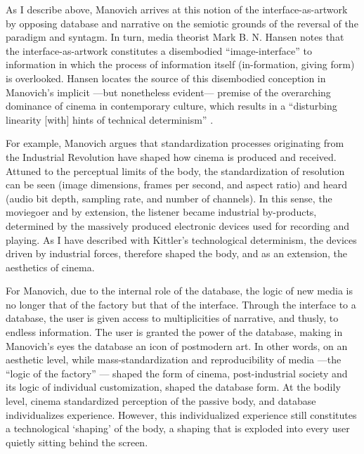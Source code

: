 As I describe above, Manovich arrives at this notion of the interface-as-artwork by opposing database and narrative on the semiotic grounds of the reversal of the paradigm and syntagm. In turn, media theorist Mark B. N. Hansen \parencite{Han04:New} notes that the interface-as-artwork constitutes a disembodied ``image-interface'' to information in which the process of information itself (in-formation, giving form) is overlooked. Hansen locates the source of this disembodied conception in Manovich's implicit ---but nonetheless evident--- premise of the overarching dominance of cinema in contemporary culture, which results in a ``disturbing linearity [with] hints of technical determinism'' \parencite[36]{Han04:New}.

For example, Manovich argues that standardization processes originating from the Industrial Revolution have shaped how cinema is produced and received. Attuned to the perceptual limits of the body, the standardization of resolution can be seen (image dimensions, frames per second, and aspect ratio) and heard (audio bit depth, sampling rate, and number of channels). In this sense, the moviegoer and by extension, the listener became industrial by-products, determined by the massively produced electronic devices used for recording and playing. As I have described with Kittler's technological determinism, the devices driven by industrial forces, therefore shaped the body, and as an extension, the aesthetics of cinema. 

For Manovich, due to the internal role of the database, the logic of new media is no longer that of the factory but that of the interface. Through the interface to a database, the user is given access to multiplicities of narrative, and thusly, to endless information. The user is granted the power of the database, making in Manovich's eyes the database an icon of postmodern art. In other words, on an aesthetic level, while mass-standardization and reproducibility of media ---the ``logic of the factory'' \parencite[30]{Man01:The}--- shaped the form of cinema, post-industrial society and its logic of individual customization, shaped the database form. At the bodily level, cinema standardized perception of the passive body, and database individualizes experience. However, this individualized experience still constitutes a technological `shaping' of the body, a shaping that is exploded into every user quietly sitting behind the screen.

